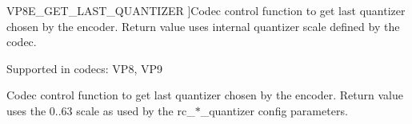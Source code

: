 \begin{Desc}
\begin{description}
{V\+P8\+E\+\_\+\+G\+E\+T\+\_\+\+L\+A\+S\+T\+\_\+\+Q\+U\+A\+N\+T\+I\+Z\+ER\hypertarget{group__vp8__encoder_gga6deae3d561c838952552c3d3756322eca5bb0569b813853e981a61c97697cbecd}{}\label{group__vp8__encoder_gga6deae3d561c838952552c3d3756322eca5bb0569b813853e981a61c97697cbecd}
}]Codec control function to get last quantizer chosen by the encoder. Return value uses internal quantizer scale defined by the codec.

Supported in codecs\+: V\+P8, V\+P9 \item[{\em 
V\+P8\+E\+\_\+\+G\+E\+T\+\_\+\+L\+A\+S\+T\+\_\+\+Q\+U\+A\+N\+T\+I\+Z\+E\+R\+\_\+64\hypertarget{group__vp8__encoder_gga6deae3d561c838952552c3d3756322ecad2cfc9712d2eab30b5a59a60d0daaade}{}\label{group__vp8__encoder_gga6deae3d561c838952552c3d3756322ecad2cfc9712d2eab30b5a59a60d0daaade}
}]Codec control function to get last quantizer chosen by the encoder. Return value uses the 0..63 scale as used by the rc\+\_\+$\ast$\+\_\+quantizer config parameters.


\end{description}
\end{Desc}
